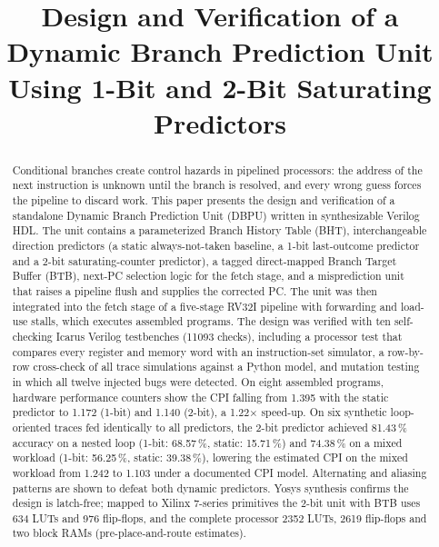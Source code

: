 \documentclass[conference]{IEEEtran}
\begin{document}
\title{Design and Verification of a Dynamic Branch Prediction Unit Using 1-Bit and 2-Bit Saturating Predictors}

\author{
}

\maketitle

\begin{abstract}
Conditional branches create control hazards in pipelined processors: the address of the next
instruction is unknown until the branch is resolved, and every wrong guess forces the pipeline to
discard work. This paper presents the design and verification of a standalone Dynamic Branch
Prediction Unit (DBPU) written in synthesizable Verilog HDL. The unit contains a parameterized
Branch History Table (BHT), interchangeable direction predictors (a static always-not-taken
baseline, a 1-bit last-outcome predictor and a 2-bit saturating-counter predictor), a tagged
direct-mapped Branch Target Buffer (BTB), next-PC selection logic for the fetch stage, and a
misprediction unit that raises a pipeline flush and supplies the corrected PC. The unit was then
integrated into the fetch stage of a five-stage RV32I pipeline with forwarding and load-use
stalls, which executes assembled programs. The design was verified with ten self-checking Icarus
Verilog testbenches (11093 checks), including a processor test that compares every register and
memory word with an instruction-set simulator, a row-by-row cross-check of all trace simulations
against a Python model, and mutation testing in which all twelve injected bugs were detected. On
eight assembled programs, hardware performance counters show the CPI falling from 1.395 with the
static predictor to 1.172 (1-bit) and 1.140 (2-bit), a 1.22$\times$ speed-up. On six synthetic loop-oriented traces fed
identically to all predictors, the 2-bit predictor achieved 81.43\,\% accuracy on a nested loop
(1-bit: 68.57\,\%, static: 15.71\,\%) and 74.38\,\% on a mixed workload (1-bit: 56.25\,\%,
static: 39.38\,\%), lowering the estimated CPI on the mixed workload from 1.242 to 1.103 under a
documented CPI model. Alternating and aliasing patterns are shown to defeat both dynamic
predictors. Yosys synthesis confirms the design is latch-free; mapped to Xilinx 7-series
primitives the 2-bit unit with BTB uses 634 LUTs and 976 flip-flops, and the complete processor
2352 LUTs, 2619 flip-flops and two block RAMs (pre-place-and-route estimates).
\end{abstract}
\end{document}
